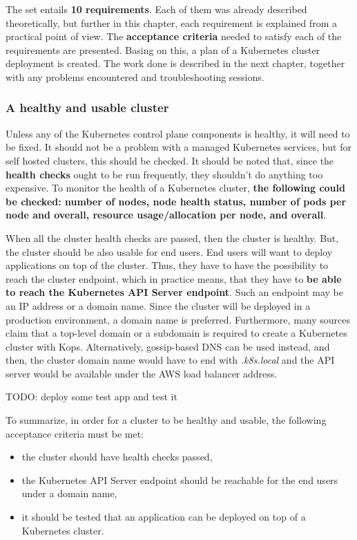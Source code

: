The set entails \textbf{10 requirements}. Each of them was already described theoretically, but further in this chapter, each requirement is explained from a practical point of view. The \textbf{acceptance criteria} needed to satisfy each of the requirements are presented. Basing on this, a plan of a Kubernetes cluster deployment is created. The work done is described in the next chapter, together with any problems encountered and troubleshooting sessions.

\subsubsection{A healthy and usable cluster}
\label{A healthy cluster}

Unless any of the Kubernetes control plane components is healthy, it will need to be fixed. It should not be a problem with a managed Kubernetes services, but for self hosted clusters, this should be checked. It should be noted that, since the \textbf{health checks} ought to be run frequently, they shouldn't do anything too expensive. To monitor the health of a Kubernetes cluster, \textbf{the following could be checked: number of nodes, node health status, number of pods per node and overall, resource usage/allocation per node, and overall}\cite{book-cndwk}.

When all the cluster health checks are passed, then the cluster is healthy. But, the cluster should be also usable for end users. End users will want to deploy applications on top of the cluster. Thus, they have to have the possibility to reach the cluster endpoint, which in practice means, that they have to \textbf{be able to reach the Kubernetes API Server endpoint}. Such an endpoint may be an IP address or a domain name. Since the cluster will be deployed in a production environment, a domain name is preferred. Furthermore, many sources claim that a top-level domain or a subdomain is required to create a Kubernetes cluster with Kops. Alternatively, gossip-based DNS can be used instead, and then, the cluster domain name would have to end with \textit{.k8s.local} and the API server would be available under the AWS load balancer address\cite{kops-howto-aws}\cite{online-kops-aws}\cite{kops-howto-k8s}\cite{kops-gossip}.

TODO: deploy some test app and test it

To summarize, in order for a cluster to be healthy and usable, the following acceptance criteria must be met:
\begin{itemize}
\item the cluster should have health checks passed,
\item the Kubernetes API Server endpoint should be reachable for the end users under a domain name,
\item it should be tested that an application can be deployed on top of a Kubernetes cluster.
\end{itemize}

